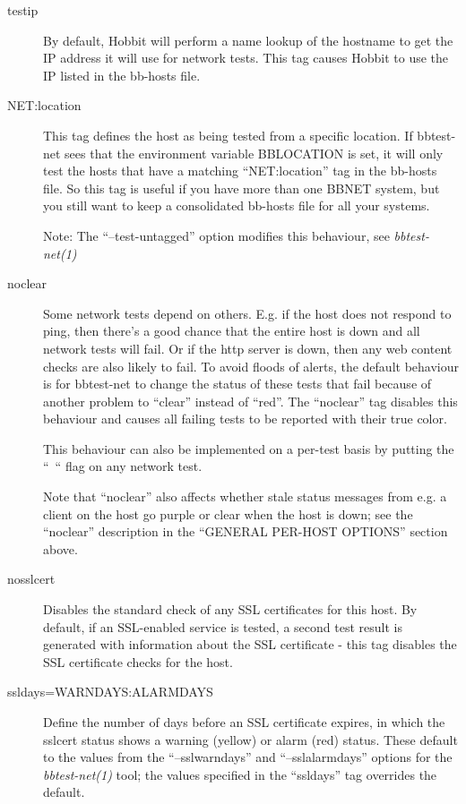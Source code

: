 \begin{description}
\item[testip] By default, Hobbit will perform a name lookup of the
  hostname to get the IP address it will use for network tests. This
  tag causes Hobbit to use the IP listed in the bb-hosts file. 


 

\item[NET:location] This tag defines the host as being tested from a
  specific location. If bbtest-net sees that the environment variable
  BBLOCATION is set, it will only test the hosts that have a matching
  ``NET:location'' tag in the bb-hosts file. So this tag is useful if
  you have more than one BBNET system, but you still want to keep a
  consolidated bb-hosts file for all your systems. 


  Note: The ``--test-untagged'' option modifies this behaviour, see \emph{bbtest-net(1)}



 

\item[noclear] Some network tests depend on others. E.g. if the host
  does not respond to ping, then there's a good chance that the entire
  host is down and all network tests will fail. Or if the http server
  is down, then any web content checks are also likely to fail. To
  avoid floods of alerts, the default behaviour is for bbtest-net to
  change the status of these tests that fail because of another
  problem to ``clear'' instead of ``red''. The ``noclear'' tag
  disables this behaviour and causes all failing tests to be reported
  with their true color. 


  This behaviour can also be implemented on a per-test basis by putting the ``~`` flag on any network test. 


  Note that ``noclear'' also affects whether stale status messages
  from e.g. a client on the host go purple or clear when the host is
  down; see the ``noclear'' description in the ``GENERAL PER-HOST
  OPTIONS'' section above. 

\item[nosslcert] Disables the standard check of any SSL certificates
  for this host. By default, if an SSL-enabled service is tested, a
  second test result is generated with information about the SSL
  certificate - this tag disables the SSL certificate checks for the
  host. 


 

\item[ssldays=WARNDAYS:ALARMDAYS] Define the number of days before an
  SSL certificate expires, in which the sslcert status shows a warning
  (yellow) or alarm (red) status. These default to the values from the
  ``--sslwarndays'' and ``--sslalarmdays'' options for the
  \emph{bbtest-net(1)} tool; the values specified in the ``ssldays''
  tag overrides the default. 



\end{description}
